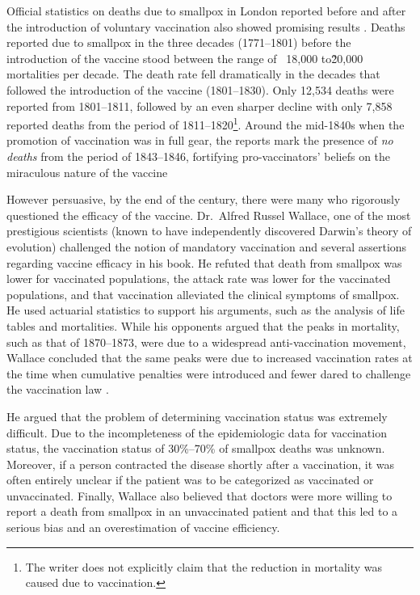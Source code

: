 \documentclass{article}
\begin{document}
Official statistics on deaths due to smallpox in London reported before and
after the introduction of voluntary vaccination also showed promising results
\citep{edwardes_2007}. Deaths reported due to smallpox in the three decades
(1771--1801) before the introduction of the vaccine stood between the range of
~18,000 to\~20,000 mortalities per decade. The death rate fell dramatically in
the decades that followed the introduction of the vaccine (1801--1830). Only
12,534 deaths were reported from 1801--1811, followed by an even sharper
decline with only 7,858 reported deaths from the period of
1811--1820\footnote{The writer does not explicitly claim that the reduction in
    mortality was caused due to vaccination.}. Around the mid-1840s when the
promotion of vaccination was in full gear, the reports mark the presence of
\textit{no deaths} from the period of 1843--1846, fortifying pro-vaccinators'
beliefs on the miraculous nature of the vaccine\citep{edwardes_2007_}

However persuasive, by the end of the century, there were many who rigorously
questioned the efficacy of the vaccine. Dr.~Alfred Russel Wallace, one of the
most prestigious scientists (known to have independently discovered Darwin's
theory of evolution) challenged the notion of mandatory vaccination and several
assertions regarding vaccine efficacy in his book\citep{wallace_wheeler_1889}.
He refuted that death from smallpox was lower for vaccinated populations, the
attack rate was lower for the vaccinated populations, and that vaccination
alleviated the clinical symptoms of smallpox. He used actuarial statistics to
support his arguments, such as the analysis of life tables and mortalities.
While his opponents argued that the peaks in mortality, such as that of
1870--1873, were due to a widespread anti-vaccination movement, Wallace
concluded that the same peaks were due to increased vaccination rates at the
time when cumulative penalties were introduced and fewer dared to challenge the
vaccination law \citep{CDC2009}.

He argued that the problem of determining vaccination status was extremely
difficult. Due to the incompleteness of the epidemiologic data for vaccination
status, the vaccination status of 30\%–70\% of smallpox deaths was unknown.
Moreover, if a person contracted the disease shortly after a vaccination, it
was often entirely unclear if the patient was to be categorized as vaccinated
or unvaccinated. Finally, Wallace also believed that doctors were more willing
to report a death from smallpox in an unvaccinated patient and that this led to
a serious bias and an overestimation of vaccine efficiency.
\end{document}
